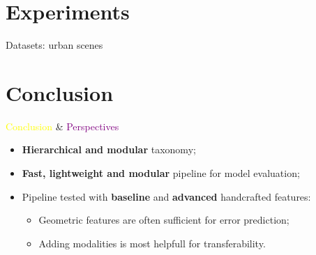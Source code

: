 \documentclass[12pt]{beamer}
\begin{document}
    \section{Experiments}
        \begin{frame}{Datasets: urban scenes}
            \centering
            
        \end{frame}
        
    \section{Conclusion}
        \begin{frame}{\textcolor{yellow}{Conclusion} \& \textcolor{purple}{Perspectives}}
            \begin{itemize}[label=\(\blacktriangleright\), font=\color{yellow}, itemsep=2em]
                \item<1-> \textbf{Hierarchical and modular} taxonomy;
                \item<2-> \textbf{Fast, lightweight and modular} pipeline for model evaluation;
                \item<3-> Pipeline tested with \textbf{baseline} and \textbf{advanced} handcrafted features:
                    \begin{itemize}[label=\(\blacktriangleright\), font=\color{IGNGreen}]
                        \item<4-> Geometric features are often sufficient for error prediction;
                        \item<5-> Adding modalities is most helpfull for transferability.
                    \end{itemize}
            \end{itemize}
        \end{frame}
\end{document}
